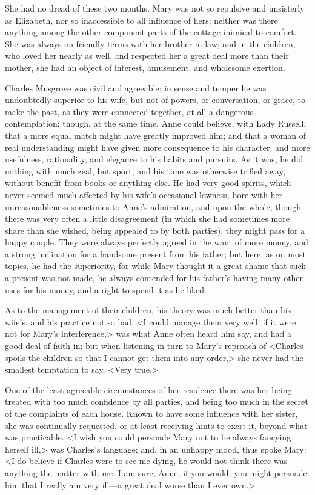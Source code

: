 She had no dread of these two months. Mary was not so repulsive and unsisterly as Elizabeth, nor so inaccessible to all influence of hers; neither was there anything among the other component parts of the cottage inimical to comfort. She was always on friendly terms with her brother-in-law; and in the children, who loved her nearly as well, and respected her a great deal more than their mother, she had an object of interest, amusement, and wholesome exertion.

Charles Musgrove was civil and agreeable; in sense and temper he was undoubtedly superior to his wife, but not of powers, or conversation, or grace, to make the past, as they were connected together, at all a dangerous contemplation; though, at the same time, Anne could believe, with Lady Russell, that a more equal match might have greatly improved him; and that a woman of real understanding might have given more consequence to his character, and more usefulness, rationality, and elegance to his habits and pursuits. As it was, he did nothing with much zeal, but sport; and his time was otherwise trifled away, without benefit from books or anything else. He had very good spirits, which never seemed much affected by his wife's occasional lowness, bore with her unreasonableness sometimes to Anne's admiration, and upon the whole, though there was very often a little disagreement (in which she had sometimes more share than she wished, being appealed to by both parties), they might pass for a happy couple. They were always perfectly agreed in the want of more money, and a strong inclination for a handsome present from his father; but here, as on most topics, he had the superiority, for while Mary thought it a great shame that such a present was not made, he always contended for his father's having many other uses for his money, and a right to spend it as he liked.

As to the management of their children, his theory was much better than his wife's, and his practice not so bad. <I could manage them very well, if it were not for Mary's interference,> was what Anne often heard him say, and had a good deal of faith in; but when listening in turn to Mary's reproach of <Charles spoils the children so that I cannot get them into any order,> she never had the smallest temptation to say, <Very true.>

One of the least agreeable circumstances of her residence there was her being treated with too much confidence by all parties, and being too much in the secret of the complaints of each house. Known to have some influence with her sister, she was continually requested, or at least receiving hints to exert it, beyond what was practicable. <I wish you could persuade Mary not to be always fancying herself ill,> was Charles's language; and, in an unhappy mood, thus spoke Mary: <I do believe if Charles were to see me dying, he would not think there was anything the matter with me. I am sure, Anne, if you would, you might persuade him that I really am very ill—a great deal worse than I ever own.>

